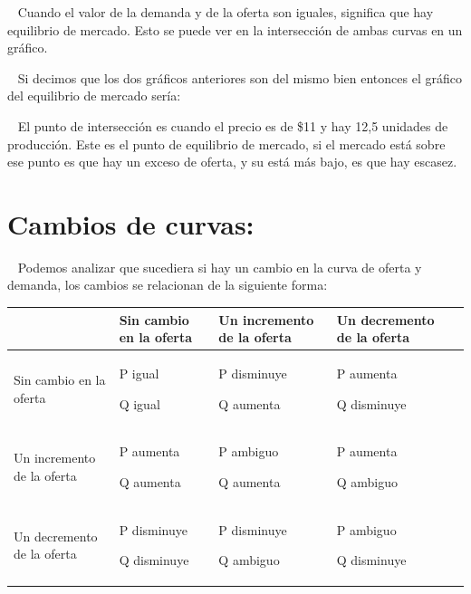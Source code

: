 \documentclass[
  letterpaper,
  DIV=11,
  numbers=noendperiod]{scrreport}
\begin{document}
~ Cuando el valor de la demanda y de la oferta son iguales, significa
que hay equilibrio de mercado. Esto se puede ver en la intersección de
ambas curvas en un gráfico.

~ Si decimos que los dos gráficos anteriores son del mismo bien entonces
el gráfico del equilibrio de mercado sería:

\begin{center}
\end{center}

~ El punto de intersección es cuando el precio es de \$11 y hay 12,5
unidades de producción. Este es el punto de equilibrio de mercado, si el
mercado está sobre ese punto es que hay un exceso de oferta, y su está
más bajo, es que hay escasez.

\hypertarget{cambios-de-curvas}{%
\section{Cambios de curvas:}\label{cambios-de-curvas}}

~ Podemos analizar que sucediera si hay un cambio en la curva de oferta
y demanda, los cambios se relacionan de la siguiente forma:

\begin{table}[H]
    \centering
    \begin{tabular}{|p{25mm}|p{25mm}|p{25mm}|p{25mm}|p{25mm}|}
        \hline
         & Sin cambio en la oferta & Un incremento de la oferta & Un decremento de la oferta  \\ \hline
        Sin cambio en la oferta & P igual \par Q igual & P disminuye \par Q aumenta & P aumenta \par Q disminuye \\ \hline
        Un incremento de la oferta & P aumenta \par Q aumenta & P ambiguo \par Q aumenta & P aumenta \par Q ambiguo\\ \hline
        Un decremento de la oferta & P disminuye \par Q disminuye & P disminuye \par Q ambiguo & P ambiguo \par Q disminuye \\ \hline
    \end{tabular}
\end{table}
\end{document}
